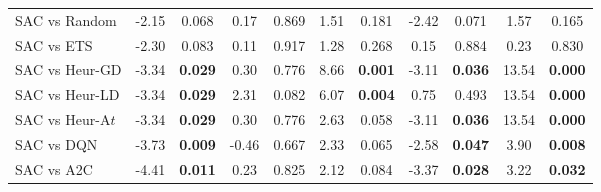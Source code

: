 \begin{tabular}{lcccccccccc}
	\midrule 
	SAC vs Random    & -2.15         & 0.068                  & 0.17          & 0.869                  & 1.51           & 0.181                 & -2.42         & 0.071                  & 1.57           & 0.165                 \\
	SAC vs ETS       & -2.30         & 0.083                  & 0.11          & 0.917                  & 1.28           & 0.268                 & 0.15          & 0.884                  & 0.23           & 0.830                 \\
	SAC vs Heur-GD   & -3.34         & \textbf{0.029}         & 0.30          & 0.776                  & 8.66           & \textbf{0.001}        & -3.11         & \textbf{0.036}         & 13.54          & \textbf{0.000}        \\
	SAC vs Heur-LD   & -3.34         & \textbf{0.029}         & 2.31          & 0.082                  & 6.07           & \textbf{0.004}        & 0.75          & 0.493                  & 13.54          & \textbf{0.000}        \\
	SAC vs Heur-A$t$ & -3.34         & \textbf{0.029}         & 0.30          & 0.776                  & 2.63           & 0.058                 & -3.11         & \textbf{0.036}         & 13.54          & \textbf{0.000}        \\
	SAC vs DQN       & -3.73         & \textbf{0.009}         & -0.46         & 0.667                  & 2.33           & 0.065                 & -2.58         & \textbf{0.047}         & 3.90           & \textbf{0.008}        \\
	SAC vs A2C       & -4.41         & \textbf{0.011}         & 0.23          & 0.825                  & 2.12           & 0.084                 & -3.37         & \textbf{0.028}         & 3.22           & \textbf{0.032}  \\
	\bottomrule      
\end{tabular}